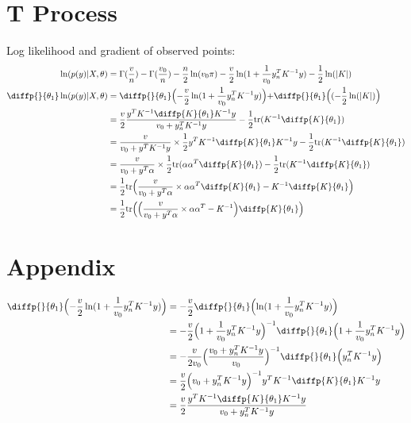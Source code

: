 \documentclass[]{article}
\begin{document}
\section{T Process}
Log likelihood and gradient of observed points:
\begin{equation}
	\begin{aligned}
		\ln(p(y) | X, \theta) &= \Gamma(\frac{v}{n}) - \Gamma(\frac{v_0}{n}) - \frac{n}{2}\ln(v_0\pi) - \frac{v}{2}\ln(1+\frac{1}{v_0}y^T_n K^{-1} y) - \frac{1}{2}\ln(|K|)\\
		\diffp{}{{\theta_1}}\ln(p(y) | X, \theta) &= \diffp{}{{\theta_1}} \Bigl( - \frac{v}{2}\ln(1+\frac{1}{v_0}y^T_n K^{-1} y) \Bigl) + \diffp{}{{\theta_1}} \Bigl((-\frac{1}{2}\ln(|K|)\Bigl) \\
		&= \frac{v}{2} \frac{y^TK^{-1} \diffp{K}{{\theta_1}} K^{-1} y}{v_0+y^T_n K^{-1} y} - \frac{1}{2}\text{tr}(K^{-1} \diffp{K}{{\theta_1}})\\
		&= \frac{v}{v_0+y^T K^{-1} y} \times \frac{1}{2} y^TK^{-1} \diffp{K}{{\theta_1}} K^{-1} y - \frac{1}{2}\text{tr}(K^{-1} \diffp{K}{{\theta_1}})\\
		&= \frac{v}{v_0 + y^T\alpha}\times\frac{1}{2} \text{tr}(\alpha\alpha^T \diffp{K}{{\theta_1}}) - \frac{1}{2}\text{tr}(K^{-1} \diffp{K}{{\theta_1}})\\
		&= \frac{1}{2}\text{tr}\Bigl(\frac{v}{v_0 + y^T\alpha} \times \alpha\alpha^T \diffp{K}{{\theta_1}} -  K^{-1} \diffp{K}{{\theta_1}}\Bigl)\\
		&= \frac{1}{2}\text{tr}\Bigl(\Bigl(\frac{v}{v_0 + y^T\alpha} \times \alpha\alpha^T - K^{-1} \Bigl) \diffp{K}{{\theta_1}} \Bigl)
	\end{aligned}
\end{equation}

\section{Appendix}
\begin{equation}
	\begin{aligned}
		\diffp{}{{\theta_1}} \Bigl( - \frac{v}{2}\ln(1+\frac{1}{v_0}y^T_n K^{-1} y) \Bigl) 
		&= - \frac{v}{2} \diffp{}{{\theta_1}} \Bigl( \ln(1+\frac{1}{v_0}y^T_n K^{-1} y) \Bigl)\\
		&= - \frac{v}{2} \Bigl(1+\frac{1}{v_0}y^T_n K^{-1} y\Bigl)^{-1}  \diffp{}{{\theta_1}} \Bigl( 1+\frac{1}{v_0}y^T_n K^{-1} y \Bigl)\\
		&= - \frac{v}{2v_0} \Bigl(\frac{v_0 + y^T_n K^{-1} y}{v_0} \Bigl)^{-1} \diffp{}{{\theta_1}}\Bigl(y^T_n K^{-1} y \Bigl)\\
		&= \frac{v}{2} \Bigl(v_0 + y^T_n K^{-1} y \Bigl)^{-1}  y^TK^{-1} \diffp{K}{{\theta_1}} K^{-1} y\\
		&= \frac{v}{2} \frac{y^TK^{-1} \diffp{K}{{\theta_1}} K^{-1} y}{v_0+y^T_n K^{-1} y}\\		
	\end{aligned}
\end{equation}
\end{document}
